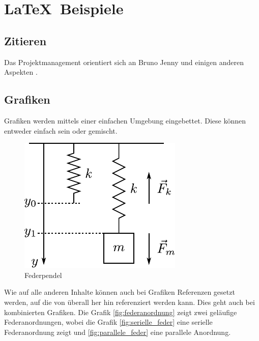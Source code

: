 \section{\LaTeX~Beispiele}

\subsection{Zitieren}
Das Projektmanagement orientiert sich an Bruno Jenny \cite{jenny} und einigen anderen Aspekten \cite{wiki:projektmanagement}.

\subsection{Grafiken}
Grafiken werden mittels einer einfachen Umgebung eingebettet. Diese können entweder einfach sein oder gemischt.

\begin{figure}[h!]\label{federpendel}
	\centering
	\includegraphics[scale=0.5]{federpendel-vertikal.pdf}
	\caption{Federpendel}
\end{figure}

Wie auf alle anderen Inhalte können auch bei Grafiken Referenzen gesetzt
werden, auf die von überall her hin referenziert werden kann. Dies geht 
auch bei kombinierten Grafiken. Die Grafik \ref{fig:federanordnung} zeigt
zwei geläufige Federanordnungen, wobei die Grafik \ref{fig:serielle_feder}
eine serielle Federanordnung zeigt und \ref{fig:parallele_feder} eine
parallele Anordnung.

